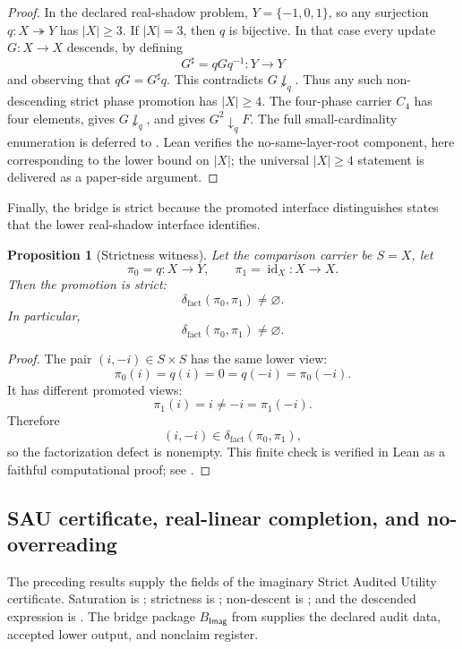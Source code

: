 \documentclass[11pt]{article}
\newcommand{\Imag}{\mathsf{Imag}}
\newcommand{\id}{\operatorname{id}}
\newtheorem{proposition}[theorem]{Proposition}
\theoremstyle{definition}
\begin{document}
\begin{proof}
In the declared real-shadow problem, \(Y=\{-1,0,1\}\), so any surjection
\(q:X\twoheadrightarrow Y\) has \(|X|\geq 3\).  If \(|X|=3\), then \(q\) is
bijective.  In that case every update \(G:X\to X\) descends, by defining
\[
G^\sharp=qGq^{-1}:Y\to Y
\]
and observing that \(qG=G^\sharp q\).  This contradicts \(G\not\downarrow_q\).
Thus any such non-descending strict phase promotion has \(|X|\geq 4\).  The
four-phase carrier \(C_4\) has four elements, 
gives \(G\not\downarrow_q\), and  gives
\(G^2\downarrow_q F\).  The full small-cardinality enumeration is deferred to
.  Lean verifies the no-same-layer-root component, here
corresponding to the lower bound on \(|X|\); the universal \(|X|\geq 4\)
statement is delivered as a paper-side argument.
\end{proof}

Finally, the bridge is strict because the promoted interface distinguishes
states that the lower real-shadow interface identifies.

\begin{proposition}[Strictness witness]
\label{prop:imag-strictness-witness}
Let the comparison carrier be \(S=X\), let
\[
\pi_0=q:X\to Y,
\qquad
\pi_1=\id_X:X\to X.
\]
Then the promotion is strict:
\[
\delta_{\mathrm{fact}}(\pi_0,
\pi_1)\neq\varnothing.
\]
In particular,
\[
\delta_{\mathrm{fact}}(\pi_0,\pi_1)\neq\varnothing.
\]
\end{proposition}

\begin{proof}
The pair \((i,-i)\in S\times S\) has the same lower view:
\[
\pi_0(i)=q(i)=0=q(-i)=\pi_0(-i).
\]
It has different promoted views:
\[
\pi_1(i)=i\neq -i=\pi_1(-i).
\]
Therefore
\[
(i,-i)\in\delta_{\mathrm{fact}}(\pi_0,\pi_1),
\]
so the factorization defect is nonempty.  This finite check is verified in
Lean as a faithful computational proof; see .
\end{proof}

\subsection{SAU certificate, real-linear completion, and no-overreading}
\label{subsec:imag-certificate-completion-no-overreading}

The preceding results supply the fields of the imaginary Strict Audited Utility
certificate.  Saturation is ; strictness is
; non-descent is
; and the descended expression is
.  The bridge package \(B_{\Imag}\) from
 supplies the declared audit data, accepted
lower output, and nonclaim register.
\end{document}
